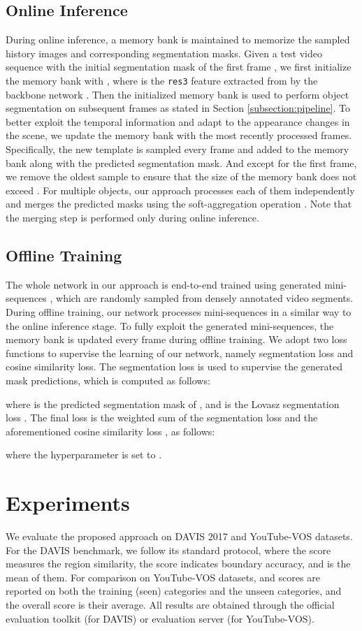 \documentclass[10pt,twocolumn,letterpaper]{article}
\begin{document}
\subsection{Online Inference}\label{subsection:inference}
During online inference, a memory bank  is maintained to memorize the sampled history images and corresponding segmentation masks. Given a test video sequence  with the initial segmentation mask  of the first frame , we first initialize the memory bank with , where  is the \texttt{res3} feature extracted from  by the backbone network . Then the initialized memory bank is used to perform object segmentation on subsequent frames as stated in Section \ref{subsection:pipeline}. To better exploit the temporal information and adapt to the appearance changes in the scene, we update the memory bank with the most recently processed frames. Specifically, the new template is sampled every  frame and added to the memory bank along with the predicted segmentation mask. And except for the first frame, we remove the oldest sample to ensure that the size of the memory bank does not exceed . For multiple objects, our approach processes each of them independently and merges the predicted masks using the soft-aggregation operation \cite{rgmp2018A}. Note that the merging step is performed only during online inference.

\subsection{Offline Training}\label{subsection:training}
The whole network in our approach is end-to-end trained using generated mini-sequences , which are randomly sampled from densely annotated video segments.
During offline training, our network processes mini-sequences in a similar way to the online inference stage. To fully exploit the generated mini-sequences, the memory bank is updated every frame during offline training. We adopt two loss functions to supervise the learning of our network, namely segmentation loss and cosine similarity loss. The segmentation loss is used to supervise the generated mask predictions, which is computed as follows:

where  is the predicted segmentation mask of , and  is the Lovasz segmentation loss \cite{Lovasz2018A}. The final loss  is the weighted sum of the segmentation loss  and the aforementioned cosine similarity loss , as follows:

where the hyperparameter  is set to .

\section{Experiments}
We evaluate the proposed approach on DAVIS 2017 \cite{DAVIS2017} and YouTube-VOS \cite{Xu2018YouTubeVOSAL} datasets. For the DAVIS benchmark, we follow its standard protocol, where the  score measures the region similarity, the  score indicates boundary accuracy, and  is the mean of them. For comparison on YouTube-VOS datasets,  and  scores are reported on both the training (seen) categories and the unseen categories, and the overall score is their average. All results are obtained through the official evaluation toolkit (for DAVIS) or evaluation server (for YouTube-VOS).
\end{document}
